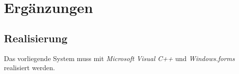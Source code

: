 
\section{Ergänzungen}


\subsection{Realisierung}

Das vorliegende System muss mit \textit{Microsoft Visual C++} und \textit{Windows.forms} realisiert werden.